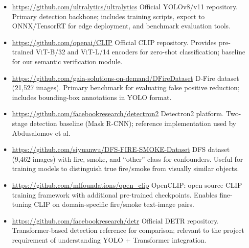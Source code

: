 \documentclass[11pt,twocolumn]{article}
\begin{document}
\begin{itemize}[leftmargin=*, itemsep=2pt]
    \item \url{https://github.com/ultralytics/ultralytics}
          Official YOLOv8/v11 repository. Primary detection backbone; includes training scripts, export to ONNX/TensorRT for edge deployment, and benchmark evaluation tools.
    \item \url{https://github.com/openai/CLIP}
          Official CLIP repository. Provides pre-trained ViT-B/32 and ViT-L/14 encoders for zero-shot classification; baseline for our semantic verification module.
    \item \url{https://github.com/gaia-solutions-on-demand/DFireDataset}
          D-Fire dataset (21,527 images). Primary benchmark for evaluating false positive reduction; includes bounding-box annotations in YOLO format.
    \item \url{https://github.com/facebookresearch/detectron2}
          Detectron2 platform. Two-stage detection baseline (Mask R-CNN); reference implementation used by Abdusalomov et al.
    \item \url{https://github.com/siyuanwu/DFS-FIRE-SMOKE-Dataset}
          DFS dataset (9,462 images) with fire, smoke, and ``other'' class for confounders. Useful for training models to distinguish true fire/smoke from visually similar objects.
    \item \url{https://github.com/mlfoundations/open_clip}
          OpenCLIP: open-source CLIP training framework with additional pre-trained checkpoints. Enables fine-tuning CLIP on domain-specific fire/smoke text-image pairs.
    \item \url{https://github.com/facebookresearch/detr}
          Official DETR repository. Transformer-based detection reference for comparison; relevant to the project requirement of understanding YOLO + Transformer integration.
\end{itemize}
\end{document}
